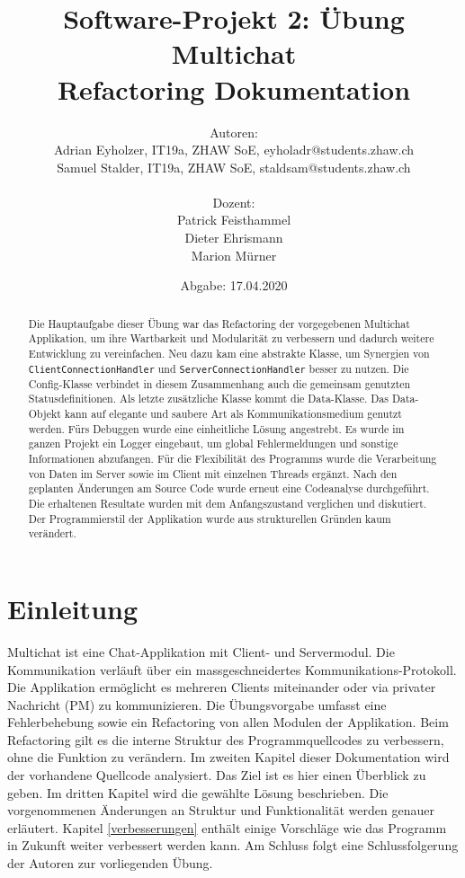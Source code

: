 \documentclass[10pt, hyperref, a4paper]{article}
\title{Software-Projekt 2: Übung Multichat\\ \vspace{.7cm}
{\huge Refactoring Dokumentation}}
\date{Abgabe: 17.04.2020}
\author{Autoren: \\Adrian Eyholzer, IT19a, ZHAW SoE, eyholadr@students.zhaw.ch \\Samuel Stalder, IT19a, ZHAW SoE, staldsam@students.zhaw.ch\\\\ Dozent: \\Patrick Feisthammel
\\Dieter Ehrismann
\\Marion Mürner}
\begin{document}
\parindent 0pt
\maketitle

\begin{abstract}
Die Hauptaufgabe dieser Übung war das Refactoring der vorgegebenen Multichat Applikation, um ihre Wartbarkeit und Modularität zu verbessern und dadurch weitere Entwicklung zu vereinfachen. Neu dazu kam eine abstrakte Klasse, um Synergien von \texttt{ClientConnectionHandler} und \texttt{ServerConnectionHandler} besser zu nutzen. Die Config-Klasse verbindet in diesem Zusammenhang auch die gemeinsam genutzten Statusdefinitionen. Als letzte zusätzliche Klasse kommt die Data-Klasse. Das Data-Objekt kann auf elegante und saubere Art als Kommunikationsmedium genutzt werden. Fürs Debuggen wurde eine einheitliche Lösung angestrebt. Es wurde im ganzen Projekt ein Logger eingebaut, um global Fehlermeldungen und sonstige Informationen abzufangen. Für die Flexibilität des Programms wurde die Verarbeitung von Daten im Server sowie im Client mit einzelnen Threads ergänzt. Nach den geplanten Änderungen am Source Code wurde erneut eine Codeanalyse durchgeführt. Die erhaltenen Resultate wurden mit dem Anfangszustand verglichen und diskutiert. Der Programmierstil der Applikation wurde aus strukturellen Gründen kaum verändert.
\end{abstract}
\vspace{3.5cm}
\newpage

\tableofcontents

\newpage


\section{Einleitung}
Multichat ist eine Chat-Applikation mit Client- und Servermodul. Die Kommunikation verläuft über ein massgeschneidertes Kommunikations-Protokoll. Die Applikation ermöglicht es mehreren Clients miteinander oder via privater Nachricht (PM) zu kommunizieren. Die Übungsvorgabe umfasst eine Fehlerbehebung sowie ein Refactoring von allen Modulen der Applikation. Beim Refactoring gilt es die interne Struktur des Programmquellcodes zu verbessern, ohne die Funktion zu verändern.\cite{FowlerRuby} Im zweiten Kapitel dieser Dokumentation wird der vorhandene  Quellcode analysiert. Das Ziel ist es hier einen Überblick zu geben. Im dritten Kapitel wird die gewählte Lösung beschrieben. Die vorgenommenen Änderungen an Struktur und Funktionalität werden genauer erläutert. Kapitel \ref{verbesserungen} enthält einige Vorschläge wie das Programm in Zukunft weiter verbessert werden kann. Am Schluss folgt eine Schlussfolgerung der Autoren zur vorliegenden Übung.
\end{document}
